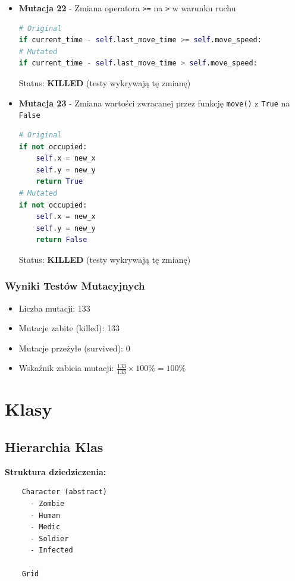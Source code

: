 \documentclass[12pt,a4paper]{article}
\begin{document}
\begin{itemize}
	\item \textbf{Mutacja 22} - Zmiana operatora \texttt{>=} na \texttt{>} w warunku ruchu
	      \begin{lstlisting}[language=Python]
# Original
if current_time - self.last_move_time >= self.move_speed:
# Mutated
if current_time - self.last_move_time > self.move_speed:
		\end{lstlisting}
	      Status: \textbf{KILLED} (testy wykrywają tę zmianę)
	\item \textbf{Mutacja 23} - Zmiana wartości zwracanej przez funkcję \texttt{move()} z \texttt{True} na \texttt{False}
	      \begin{lstlisting}[language=Python]
# Original
if not occupied:
	self.x = new_x
	self.y = new_y
	return True
# Mutated
if not occupied:
	self.x = new_x
	self.y = new_y
	return False
		  \end{lstlisting}
	      Status: \textbf{KILLED} (testy wykrywają tę zmianę)
\end{itemize}
\subsubsection{Wyniki Testów Mutacyjnych}
\begin{itemize}
	\item Liczba mutacji: 133
	\item Mutacje zabite (killed): 133
	\item Mutacje przeżyłe (survived): 0
	\item Wskaźnik zabicia mutacji: $\frac{133}{133} \times 100\% = 100\%$
\end{itemize}

\newpage

\section{Klasy}

\subsection{Hierarchia Klas}

\textbf{Struktura dziedziczenia:}

\begin{verbatim}
	Character (abstract)
	  - Zombie
	  - Human
	  - Medic
	  - Soldier
	  - Infected
	
	Grid
	\end{verbatim}
\end{document}
